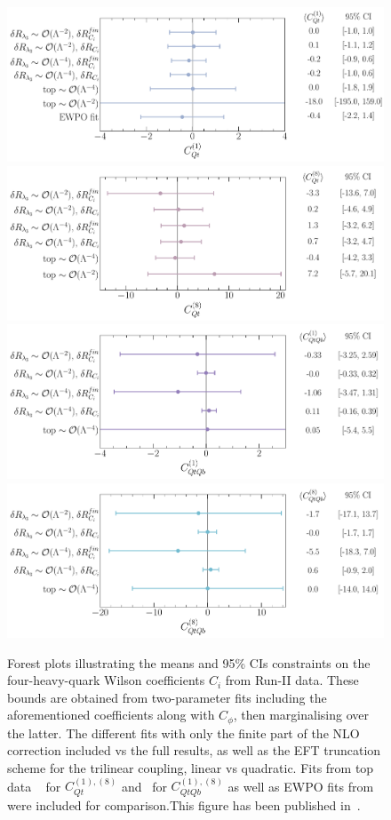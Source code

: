 	\begin{figure}[htpb!]
		\vspace*{-0.5cm}
		\begin{center}
			\includegraphics[width=0.75\linewidth]{fig/uebeblick_Cqt1}
			\includegraphics[width=0.75\linewidth]{fig/uebeblick_Cqt8} 
			\includegraphics[width=0.75\linewidth]{fig/uebeblick_Cqtqb1}
			\includegraphics[width=0.75\linewidth]{fig/uebeblick_Cqtqb8}
		\end{center}
		\vspace*{-0.5cm}
		\caption{Forest plots illustrating the means and 95\% CIs constraints on the four-heavy-quark Wilson coefficients $C_i$ from Run-II data. These bounds are obtained from two-parameter fits including the aforementioned coefficients along with $C_\phi$, then marginalising over the latter. The different fits with only the finite part of the NLO correction included vs the full results, as well as the EFT truncation scheme for the trilinear coupling, linear vs quadratic. Fits from top data ~\cite{Ethier:2021bye} for $C_{Qt}^{(1),(8)}$ and~\cite{Hartland:2019bjb} for $C_{QtQb}^{(1),(8)}$ as well as EWPO fits from~\cite{Dawson:2022bxd} were included for comparison.This figure has been published in~\cite{Alasfar:2022zyr}.}
		\label{fig:summ4f}
	\end{figure}
